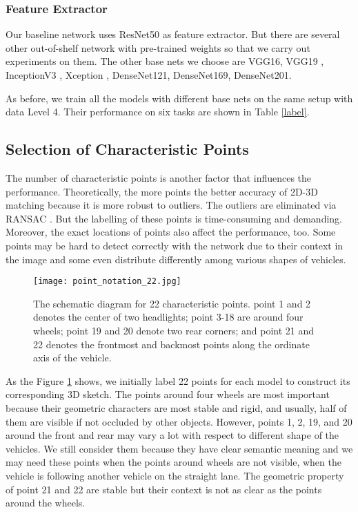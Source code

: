 \subsubsection{Feature Extractor}
Our baseline network uses ResNet50 as feature extractor. But there are several other out-of-shelf network with pre-trained weights so that we carry out experiments on them. The other base nets we choose are VGG16, VGG19 \cite{DBLP:SimonyanZ14a}, InceptionV3 \cite{DBLP:journals/corr/SzegedyVISW15}, Xception \cite{DBLP:journals/corr/Chollet16a}, DenseNet121, DenseNet169, DenseNet201\cite{DBLP:journals/corr/HuangLW16a}.

As before, we train all the models with different base nets on the same setup with data Level 4. Their performance on six tasks are shown in Table \ref{label}.


\subsection{Selection of Characteristic Points}

The number of characteristic points is another factor that influences the performance. Theoretically, the more points the better accuracy of 2D-3D matching because it is more robust to outliers. The outliers are eliminated via RANSAC \cite{Fischler:1981:RSC:358669.358692}. But the labelling of these points is time-consuming and demanding. Moreover, the exact locations of points also affect the performance, too. Some points may be hard to detect correctly with the network due to their context in the image and some even distribute differently among various shapes of vehicles. 

\begin{figure}[H]		
	\texttt{[image: point\_notation\_22.jpg]}
	\caption{The schematic diagram for 22 characteristic points. point 1 and 2 denotes the center of two headlights; point 3-18 are around four wheels; point 19 and 20 denote two rear corners; and point 21 and 22 denotes the frontmost and  backmost points along the ordinate axis of the vehicle.}
	\centering
	\label{figure:point_notation_22}
\end{figure}

As the Figure \ref{figure:point_notation_22} shows, we initially label 22 points for each model to construct its corresponding 3D sketch. The points around four wheels are most important because their geometric characters are most stable and rigid, and usually, half of them are visible if not occluded by other objects. However, points 1, 2, 19, and 20 around the front and rear may vary a lot with respect to different shape of the vehicles. We still consider them because they have clear semantic meaning and we may need these points when the points around wheels are not visible, \eg when the vehicle is following another vehicle on the straight lane. The geometric property of point 21 and 22 are stable but their context is not as clear as the points around the wheels.

